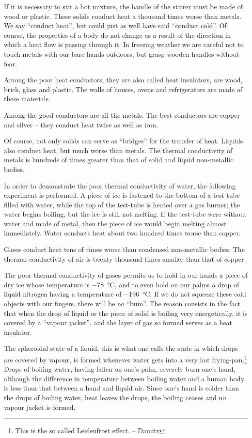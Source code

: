 If it is necessary to stir a hot mixture, the handle of the stirrer must be made of wood or plastic. These solids conduct heat a thousand times worse than metals. We say ``conduct heat'', but could just as well have said ``con­duct cold''. Of course, the properties of a body do not change as a result of the direction in which a heat flow is passing through it. In freezing weather we are careful not to touch metals with our bare hands outdoors, but grasp wooden handles without fear.

Among the poor heat conductors, they are also called heat insulators, are wood, brick, glass and plastic. The walls of houses, ovens and refrigerators are made of these materials.

Among the good conductors are all the metals. The best conductors are copper and silver -- they conduct heat twice as well as iron.

Of course, not only solids can serve as ``bridges'' for the transfer of heat. Liquids also conduct heat, but much worse than metals. The thermal conductivity of metals is hundreds of times greater than that of solid and liquid non-metallic bodies.

In order to demonstrate the poor thermal conductiv­ity of water, the following experiment is performed. A piece of ice is fastened to the bottom of a test-tube filled with water, while the top of the test-tube is heated over a gas burner; the water begins boiling, but the ice is still not melting. If the test-tube were without water and made of metal, then the piece of ice would begin melting almost immediately. Water conducts heat about two hundred times worse than copper.

Gases conduct heat tens of times worse than condensed non-metallic bodies. The thermal conductivity of air is twenty thousand times smaller than that of copper.

The poor thermal conductivity of gases permits us to hold in our hands a piece of dry ice whose temperature is \SI{-78}{\celsius}, and to even hold on our palms a drop of liquid nitrogen having a temperature of \SI{-196}{\celsius}. If we do not squeeze these cold objects with our fingers, there will be no ``bum''. The reason consists in the fact that when the drop of liquid or the piece of solid is boiling very energet­ically, it is covered by a ``vapour jacket'', and the layer of gas so formed serves as a heat insulator.

The spheroidal state of a liquid, this is what one calls the state in which drops are covered by vapour, is formed whenever water gets into a very hot frying-pan.\footnote{This is the so called Leidenfrost effect. -- Damitr} Drops of boiling water, having fallen on one’s palm, severely burn one’s hand, although the difference in temperature between boiling water and a human body is less than that between a hand and liquid air. Since one’s hand is colder than the drops of boiling water, heat leaves the drops, the boiling ceases and no vapour jacket is formed.

